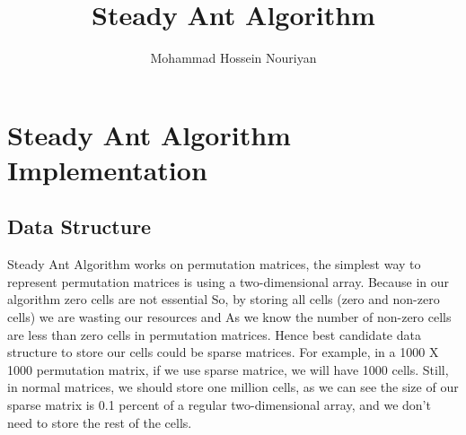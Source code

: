 \documentclass[a4paper,12pt]{report}
\begin{document}
\title{Steady Ant Algorithm}
\author{Mohammad Hossein Nouriyan}
\maketitle

\chapter{Steady Ant Algorithm Implementation}
\section{Data Structure}
Steady Ant Algorithm works on permutation matrices, the simplest way to represent permutation matrices is using a two-dimensional array. Because in our algorithm zero cells are not essential So, by storing all cells (zero and non-zero cells) we are wasting our resources and As we know the number of non-zero cells are less than zero cells in permutation matrices. Hence best candidate data structure to store our cells could be sparse matrices. For example, in a 1000 X 1000 permutation matrix, if we use sparse matrice, we will have 1000 cells. Still, in normal matrices, we should store one million cells, as we can see the size of our sparse matrix is 0.1 percent of a regular two-dimensional array, and we don't need to store the rest of the cells.
\end{document}
